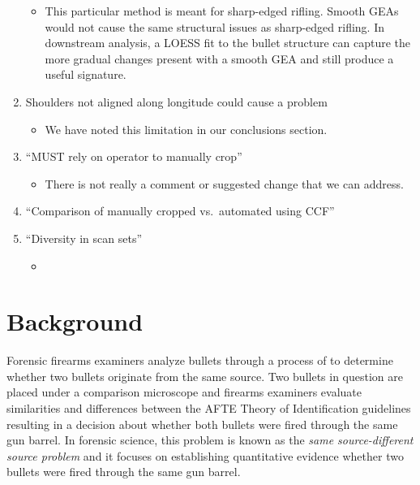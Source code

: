 \documentclass[12pt]{article}
\providecommand{\tightlist}{%
  \setlength{\itemsep}{0pt}\setlength{\parskip}{0pt}}
\begin{document}
\begin{enumerate}
  \begin{itemize}
  \tightlist
  \item
    This particular method is meant for sharp-edged rifling. Smooth GEAs
    would not cause the same structural issues as sharp-edged rifling.
    In downstream analysis, a LOESS fit to the bullet structure can
    capture the more gradual changes present with a smooth GEA and still
    produce a useful signature.
  \end{itemize}
\item
  Shoulders not aligned along longitude could cause a problem

  \begin{itemize}
  \tightlist
  \item
    We have noted this limitation in our conclusions section.
  \end{itemize}
\item
  ``MUST rely on operator to manually crop''

  \begin{itemize}
  \tightlist
  \item
    There is not really a comment or suggested change that we can
    address.
  \end{itemize}
\item
  ``Comparison of manually cropped vs.~automated using CCF''
\item
  ``Diversity in scan sets''

  \begin{itemize}
  \item
    {\color{teal}{We have added an additional test set, Phoenix PD, to our results section. This has also been detailed in the data source section.}}
  \end{itemize}
\end{enumerate}

\section{Background}

Forensic firearms examiners analyze bullets through a process of
{\color{teal}{visual comparison}} to determine whether two bullets
originate from the same source. Two bullets in question are placed under
a comparison microscope and firearms examiners evaluate similarities and
differences between
{\color{teal}{striated toolmarks produced on fired bullets from rifled barrels. The assessment of these patterns follows}}
the AFTE Theory of Identification \citep{AFTE} guidelines resulting in a
decision about whether both bullets were fired through the same gun
barrel. In forensic science, this problem is known as the \emph{same
source-different source problem} {\color{teal}{[see @Ommen1]}} and it
focuses on establishing quantitative evidence whether two bullets were
fired through the same gun barrel.
\end{document}
